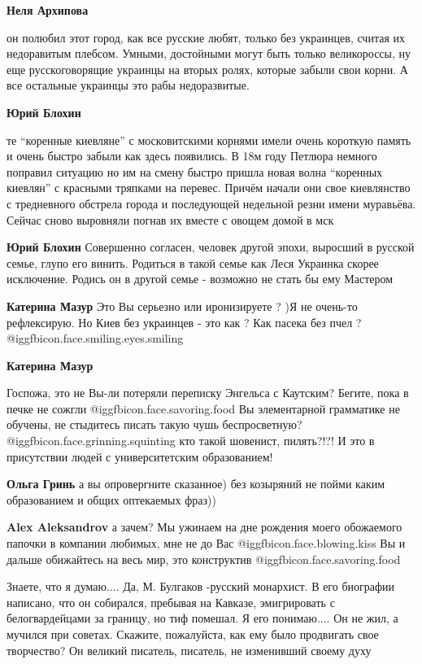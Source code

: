 \begin{itemize}
\begin{itemize}
\begin{itemize}
\textbf{Неля Архипова} 

он полюбил этот город, как все русские любят, только без украинцев, считая их
недоравитым плебсом. Умными, достойными могут быть только великороссы, ну еще
русскоговорящие украинцы на вторых ролях, которые забыли свои корни. А все
остальные украинцы это рабы недоразвитые.

\textbf{Юрий Блохин} 

те \enquote{коренные киевляне} с московитскими корнями имели очень короткую память и
очень быстро забыли как здесь появились. В 18м году Петлюра немного поправил
ситуацию но им на смену быстро пришла новая волна \enquote{коренных киевлян} с красными
тряпками на перевес. Причём начали они свое киевлянство с тредневного обстрела
города и последующей недельной резни имени муравьёва. Сейчас сново выровняли
погнав их вместе с овощем домой в мск

\textbf{Юрий Блохин} Совершенно согласен, человек другой эпохи, выросший в русской семье, глупо его винить. Родиться в такой семье как Леся Украинка скорее исключение. Родись он в другой семье - возможно не стать бы ему Мастером

\textbf{Катерина Мазур} Это Вы серьезно или иронизируете ? )Я не очень-то рефлексирую. Но Киев без украинцев - это как ? Как пасека без пчел ? @igg{fbicon.face.smiling.eyes.smiling} 

\textbf{Катерина Мазур} 

Госпожа, это не Вы-ли потеряли переписку Энгельса с Каутским? Бегите, пока в
печке не сожгли @igg{fbicon.face.savoring.food}  Вы элементарной грамматике не обучены, не стыдитесь писать
такую чушь беспросветную? @igg{fbicon.face.grinning.squinting}  кто такой шовенист, пилять?!?! И это в присутствии
людей с университетским образованием!


\textbf{Ольга Гринь} а вы опровергните сказанное) без козыряний не пойми каким образованием и общих оптекаемых фраз))

\textbf{Alex Aleksandrov} а зачем? Мы ужинаем на дне рождения моего обожаемого папочки в компании любимых, мне не до Вас @igg{fbicon.face.blowing.kiss}  Вы и дальше обижайтесь на весь мир, это конструктив @igg{fbicon.face.savoring.food} 
\end{itemize} %


Знаете, что я думаю.... Да, М. Булгаков -русский монархист. В его биографии
написано, что он собирался, пребывая на Кавказе, эмигрировать с белогвардейцами
за границу, но тиф помешал. Я его понимаю.... Он не жил, а мучился при
советах. Скажите, пожалуйста, как ему было продвигать свое творчество? Он великий
писатель, писатель, не изменивший своему духу


\end{itemize}
\end{itemize}
